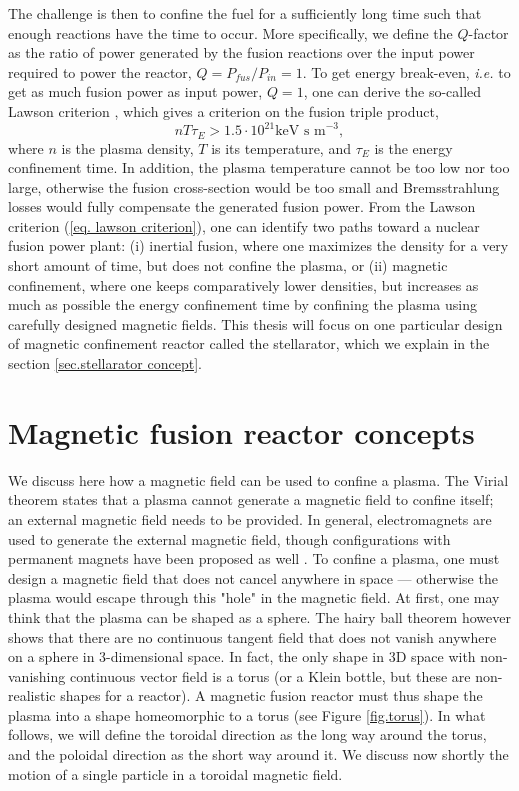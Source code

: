 \documentclass[my_thesis.tex]{subfiles}
\begin{document}
The challenge is then to confine the fuel for a sufficiently long time such that enough reactions have the time to occur. More specifically, we define the $Q$-factor as the ratio of power generated by the fusion reactions over the input power required to power the reactor, $Q=P_{fus}/P_{in}=1$. To get energy break-even, \textit{i.e.} to get as much fusion power as input power, $Q=1$, one can derive the so-called Lawson criterion \citep{lawsonCriteriaPowerProducing1957}, which gives a criterion on the fusion triple product,
\begin{equation}
    nT\tau_E > 1.5\cdot 10^{21}\text{keV s m}^{-3}, \label{eq. lawson criterion}
\end{equation} 
where $n$ is the plasma density, $T$ is its temperature, and $\tau_E$ is the energy confinement time. In addition, the plasma temperature cannot be too low nor too large, otherwise the fusion cross-section would be too small and Bremsstrahlung losses would fully compensate the generated fusion power. From the Lawson criterion (\ref{eq. lawson criterion}), one can identify two paths toward a nuclear fusion power plant: (i) inertial fusion, where one maximizes the density for a very short amount of time, but does not confine the plasma, or (ii) magnetic confinement, where one keeps comparatively lower densities, but increases as much as possible the energy confinement time by confining the plasma using carefully designed magnetic fields. This thesis will focus on one particular design of magnetic confinement reactor called the stellarator, which we explain in the section \ref{sec.stellarator concept}.


\section{Magnetic fusion reactor concepts} 
We discuss here how a magnetic field can be used to confine a plasma. The Virial theorem \citep{Freidberg2014} states that a plasma cannot generate a magnetic field to confine itself; an external magnetic field needs to be provided. In general, electromagnets are used to generate the external magnetic field, though configurations with permanent magnets have been proposed as well \citep{qianSimplerOptimizedStellarators2022,zhuPM4StellPrototypePermanent2022}. To confine a plasma, one must design a magnetic field that does not cancel anywhere in space --- otherwise the plasma would escape through this "hole" in the magnetic field. At first, one may think that the plasma can be shaped as a sphere. The hairy ball theorem \citep{Renteln2013-uu} however shows that there are no continuous tangent field that does not vanish anywhere on a sphere in 3-dimensional space. In fact, the only shape in 3D space with non-vanishing continuous vector field is a torus (or a Klein bottle, but these are non-realistic shapes for a reactor). A magnetic fusion reactor must thus shape the plasma into a shape homeomorphic to a torus (see Figure \ref{fig.torus}).  In what follows, we will define the toroidal direction as the long way around the torus, and the poloidal direction as the short way around it. We discuss now shortly the motion of a single particle in a toroidal magnetic field.
\end{document}
